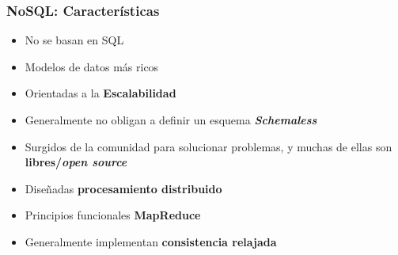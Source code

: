 \begin{frame}[allowframebreaks]
 \frametitle{NoSQL: Características}
\begin{itemize}
\item No se basan en SQL
\item Modelos de datos más ricos
\item Orientadas a la {\bf Escalabilidad}
\item Generalmente no obligan a definir un esquema \ra{}
  {\itshape\bfseries Schemaless}
\item Surgidos de la comunidad para solucionar problemas, y muchas de
  ellas son {\bf libres/{\itshape open source}}
\item Diseñadas \ra{} {\bf procesamiento distribuido}
\item Principios funcionales \ra{} {\bf MapReduce}
\item Generalmente implementan {\bf consistencia relajada}
\end{itemize}


\end{frame}



